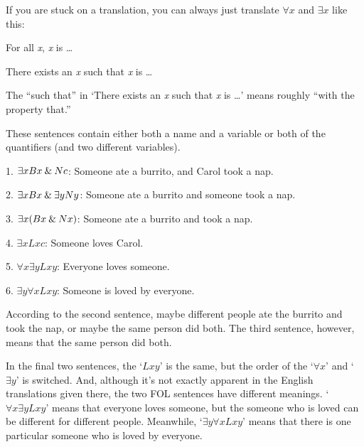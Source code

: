 If you are stuck on a translation, you can always just translate $\forall x$ and $\exists x$ like this:
\begin{ebullet}
\item[] For all \textit{x}, \textit{x} is \ldots
\item[] There exists an \textit{x} such that \textit{x} is \ldots
\end{ebullet}

\begin{notebox}
The ``such that'' in `There exists an \textit{x} such that \textit{x} is \ldots' means roughly ``with the property that.''  
\end{notebox} 


These sentences contain either both a name and a variable or both of the quantifiers (and two different variables).
\begin{ebullet}
	\item[1.]$\exists xBx \mathbin{\&} Nc$: Someone ate a burrito, and Carol took a nap.\smallskip
	\item[2.]$\exists xBx \mathbin{\&} \exists yNy$: Someone ate a burrito and someone took a nap.\smallskip
	\item[3.]$\exists x(Bx \mathbin{\&} Nx)$: Someone ate a burrito and took a nap.\smallskip
	\item[4.]$\exists xLxc$: Someone loves Carol.\smallskip
	\item[5.]$\forall x \exists yLxy$: Everyone loves someone.\smallskip
	\item[6.]$\exists y \forall xLxy$: Someone is loved by everyone.
\end{ebullet}
According to the second sentence, maybe different people ate the burrito and took the nap, or maybe the same person did both. The third sentence, however, means that the same person did both.

\label{quantifier-order} In the final two sentences, the `$Lxy$' is the same, but the order of the `$\forall x$' and `$\exists y$' is switched. And, although it's not exactly apparent in the English translations given there, the two FOL sentences have different meanings. `$\forall x \exists yLxy$' means that everyone loves someone, but the someone who is loved can be different for different people. Meanwhile, `$\exists y \forall xLxy$' means that there is one particular someone who is loved by everyone.

